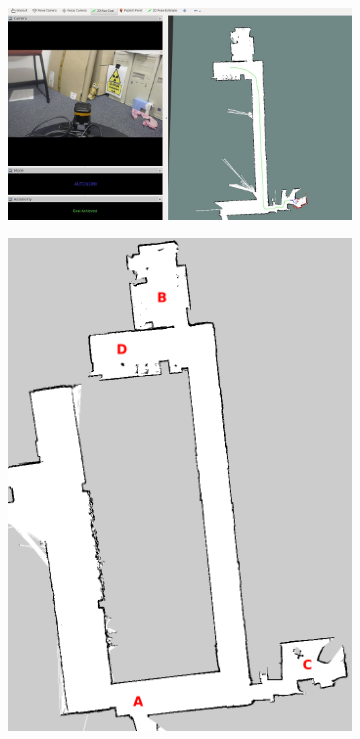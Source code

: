 \documentclass[a4paper,12pt,oneside,openright]{bhamthesis}
\begin{document}
\begin{figure}
		\centering
		\begin{subfigure}[b]{0.59\textwidth}
			\centering
			\includegraphics[width=\textwidth]{chapter5_fig/exp3_interface.jpg}
			\caption{}
			\label{subfig:interface_exp3}
		\end{subfigure}
		\hfill
		\begin{subfigure}[b]{0.3\textwidth}
			\centering
			\includegraphics[width=\textwidth]{chapter5_fig/map_exp3.png}

\end{subfigure}
\end{figure}
\end{document}
